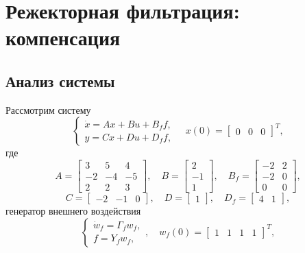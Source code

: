 \section{Режекторная фильтрация: компенсация}

\subsection{Анализ системы}

Рассмотрим систему
\begin{equation}
    \label{eq:sys1}
    \begin{cases}
        \dot x = Ax+Bu+B_ff,\\
        y=Cx+Du+D_ff,
    \end{cases}\quad x(0)=\begin{bmatrix}
        0&0&0
    \end{bmatrix}^T,
\end{equation}
где
\begin{equation*}
    A=\begin{bmatrix}
        3 & 5 & 4 \\
        -2 & -4 & -5 \\
        2 & 2 & 3
    \end{bmatrix},\quad
    B=\begin{bmatrix}
        2 \\ -1 \\ 1
    \end{bmatrix},\quad
    B_f=\begin{bmatrix}
        -2 & 2 \\ -2 & 0 \\ 0 & 0
    \end{bmatrix},
\end{equation*}
\begin{equation*}
    C=\begin{bmatrix}
        -2&-1&0
    \end{bmatrix},\quad
    D=\begin{bmatrix}
        1
    \end{bmatrix},\quad
    D_f=\begin{bmatrix}
        4&1
    \end{bmatrix},
\end{equation*}
генератор внешнего воздействия
\begin{equation}
    \label{eq:sys_f}
    \begin{cases}
        \dot w_f=\Gamma_fw_f,\\
        f=Y_fw_f,
    \end{cases},\quad     w_f(0)=\begin{bmatrix}
        1&1&1&1
    \end{bmatrix}^T,
\end{equation}
